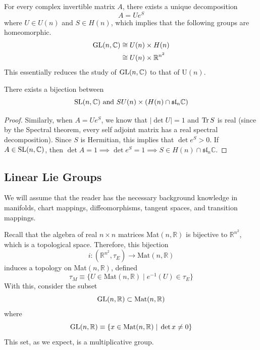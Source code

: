   \begin{corollary}
    For every complex invertible matrix $A$, there exists a unique decomposition
    \begin{equation}
      A = U e^S
    \end{equation}
    where $U \in U(n)$ and $S \in H(n)$, which implies that the following groups are homeomorphic. 
    \begin{align*}
      \operatorname{GL}(n, \mathbb{C}) & \cong U(n) \times H(n) \\
      & \cong U(n) \times \mathbb{R}^{n^2}
    \end{align*} 
    This essentially reduces the study of $\operatorname{GL}(n, \mathbb{C})$ to that of U$(n)$. 
  \end{corollary}

  \begin{corollary}
    There exists a bijection between 
    \begin{equation}
      \operatorname{SL}(n, \mathbb{C}) \text{ and } SU(n) \times (H(n) \cap \mathfrak{sl}_n \mathbb{C})
    \end{equation}
  \end{corollary}
  \begin{proof}
    Similarly, when $A = U e^S$, we know that $|\det{U}| = 1$ and $\operatorname{Tr}{S}$ is real (since by the Spectral theorem, every self adjoint matrix has a real spectral decomposition). Since $S$ is Hermitian, this implies that $\det{e^S} > 0$. If $A \in \operatorname{SL}(n, \mathbb{C})$, then $\det{A} = 1 \implies \det{e^S} = 1 \implies S \in H(n) \cap \mathfrak{sl}_n \mathbb{C}$. 
  \end{proof}

\subsection{Linear Lie Groups}

  We will assume that the reader has the necessary background knowledge in manifolds, chart mappings, diffeomorphisms, tangent spaces, and transition mappings. 

  Recall that the algebra of real $n \times n$ matrices Mat$(n, \mathbb{R})$ is bijective to $\mathbb{R}^{n^2}$, which is a topological space. Therefore, this bijection 
  \begin{equation}
    i:(\mathbb{R}^{n^2}, \tau_E) \longrightarrow \text{Mat}(n, \mathbb{R})
  \end{equation}
  induces a topology on Mat$(n, \mathbb{R})$, defined 
  \begin{equation}
    \tau_M \equiv \{U \in \text{Mat}(n, \mathbb{R}) \; | \; e^{-1} (U) \in \tau_E\}
  \end{equation}
  With this, consider the subset
  \begin{equation}
    \operatorname{GL}(n, \mathbb{R}) \subset \text{Mat}(n, \mathbb{R})
  \end{equation}
  where
  \begin{equation}
    \operatorname{GL}(n, \mathbb{R}) \equiv \{x \in \text{Mat}(n, \mathbb{R}) \;|\; \det{x} \neq 0\}
  \end{equation}
  This set, as we expect, is a multiplicative group. 

